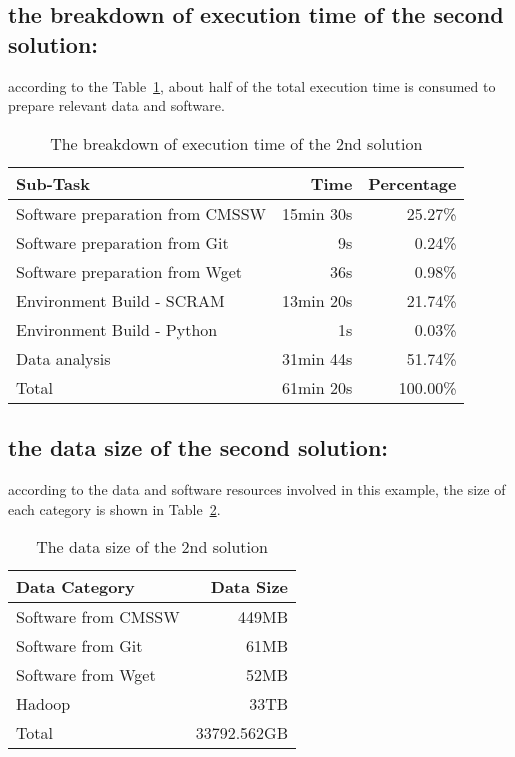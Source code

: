 \documentclass{article}
\begin{document}
\subsection{the breakdown of execution time of the second solution: }
\indent according to the Table~\ref{table:time-2nd}, about half of the total execution time is consumed to prepare relevant data and software.

\begin{table}
    \centering
    \begin{tabular}{|l|r|r|}
    \hline
    Sub-Task & Time & Percentage \\ \hline
    Software preparation from CMSSW & 15min 30s & 25.27\% \\ \hline
    Software preparation from Git & 9s & 0.24\% \\ \hline
    Software preparation from Wget & 36s & 0.98\% \\ \hline
    Environment Build - SCRAM & 13min 20s & 21.74\% \\ \hline
    Environment Build - Python & 1s & 0.03\% \\ \hline
    Data analysis & 31min 44s & 51.74\% \\ \hline
    Total & 61min 20s & 100.00\% \\ \hline
    \end{tabular}
    \caption{The breakdown of execution time of the 2nd solution}
    \label{table:time-2nd}
\end{table}

\subsection{the data size of the second solution:}
\indent according to the data and software resources involved in this example, the size of each category is shown in Table~\ref{table:datasize-2nd}.

\begin{table}
    \centering
    \begin{tabular}{|l|r|}
    \hline
    Data Category & Data Size \\ \hline
    Software from CMSSW & 449MB \\ \hline
    Software from Git & 61MB \\ \hline
    Software from Wget & 52MB \\ \hline
    Hadoop & 33TB \\ \hline
    Total & 33792.562GB \\ \hline
    \end{tabular}
    \caption{The data size of the 2nd solution}
    \label{table:datasize-2nd}
\end{table}
\end{document}
